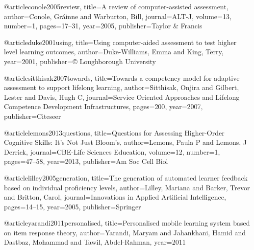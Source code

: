 @article{conole2005review,
  title={A review of computer-assisted assessment},
  author={Conole, Gr{\'a}inne and Warburton, Bill},
  journal={ALT-J},
  volume={13},
  number={1},
  pages={17--31},
  year={2005},
  publisher={Taylor \& Francis}
}

@article{duke2001using,
  title={Using computer-aided assessment to test higher level learning outcomes},
  author={Duke-Williams, Emma and King, Terry},
  year={2001},
  publisher={{\copyright} Loughborough University}
}

@article{sitthisak2007towards,
  title={Towards a competency model for adaptive assessment to support lifelong learning},
  author={Sitthisak, Onjira and Gilbert, Lester and Davis, Hugh C},
  journal={Service Oriented Approaches and Lifelong Competence Development Infrastructures},
  pages={200},
  year={2007},
  publisher={Citeseer}
}

@article{lemons2013questions,
  title={Questions for Assessing Higher-Order Cognitive Skills: It's Not Just Bloom’s},
  author={Lemons, Paula P and Lemons, J Derrick},
  journal={CBE-Life Sciences Education},
  volume={12},
  number={1},
  pages={47--58},
  year={2013},
  publisher={Am Soc Cell Biol}
}

@article{lilley2005generation,
  title={The generation of automated learner feedback based on individual proficiency levels},
  author={Lilley, Mariana and Barker, Trevor and Britton, Carol},
  journal={Innovations in Applied Artificial Intelligence},
  pages={14--15},
  year={2005},
  publisher={Springer}
}

@article{yarandi2011personalised,
  title={Personalised mobile learning system based on item response theory},
  author={Yarandi, Maryam and Jahankhani, Hamid and Dastbaz, Mohammad and Tawil, Abdel-Rahman},
  year={2011}
}

